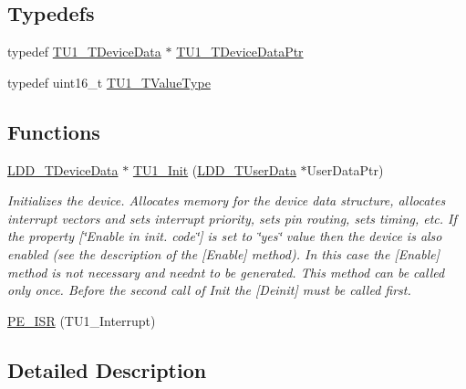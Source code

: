 \subsection*{Typedefs}
\begin{DoxyCompactItemize}
\item 
typedef \hyperlink{struct_t_u1___t_device_data}{T\+U1\+\_\+\+T\+Device\+Data} $\ast$ \hyperlink{group___t_u1__module_ga992897b60934aa5b8d6edb262c3bba55}{T\+U1\+\_\+\+T\+Device\+Data\+Ptr}
\item 
typedef uint16\+\_\+t \hyperlink{group___t_u1__module_ga10e196ba4fbf739bb461e1e9379ab405}{T\+U1\+\_\+\+T\+Value\+Type}
\end{DoxyCompactItemize}
\subsection*{Functions}
\begin{DoxyCompactItemize}
\item 
\hyperlink{group___p_e___types__module_gac5cf1362f1f0e3a2ce71b1bf2276d091}{L\+D\+D\+\_\+\+T\+Device\+Data} $\ast$ \hyperlink{group___t_u1__module_ga9bfbdf45fe9128c8d9e4245e3480d6da}{T\+U1\+\_\+\+Init} (\hyperlink{group___p_e___types__module_ga0b66a73f87238a782318aa0be7578e35}{L\+D\+D\+\_\+\+T\+User\+Data} $\ast$User\+Data\+Ptr)
\begin{DoxyCompactList}\small\item\em Initializes the device. Allocates memory for the device data structure, allocates interrupt vectors and sets interrupt priority, sets pin routing, sets timing, etc. If the property \mbox{[}\char`\"{}\+Enable in init. code\char`\"{}\mbox{]} is set to \char`\"{}yes\char`\"{} value then the device is also enabled (see the description of the \mbox{[}Enable\mbox{]} method). In this case the \mbox{[}Enable\mbox{]} method is not necessary and needn\textquotesingle{}t to be generated. This method can be called only once. Before the second call of Init the \mbox{[}Deinit\mbox{]} must be called first. \end{DoxyCompactList}\item 
\hyperlink{group___t_u1__module_gaa41b92c05e2ee5c591e4960928551eb0}{P\+E\+\_\+\+I\+SR} (T\+U1\+\_\+\+Interrupt)
\end{DoxyCompactItemize}


\subsection{Detailed Description}


